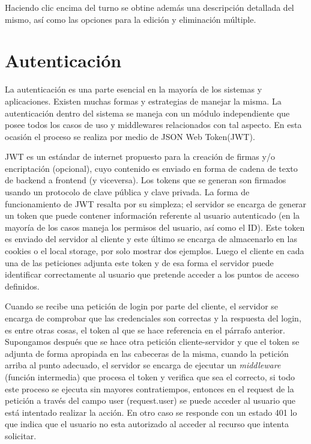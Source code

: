 Haciendo clic encima del turno se obtine además una descripción detallada del mismo, así como las opciones para la edición y eliminación múltiple.

\section{Autenticación}

La autenticación es una parte esencial en la mayoría de los sistemas y aplicaciones. Existen muchas formas y estrategias de manejar la misma. La autenticación dentro del sistema se maneja con un módulo independiente que posee todos los casos de uso y middlewares relacionados con tal aspecto. En esta ocasión el proceso se realiza por medio de JSON Web Token(JWT).

JWT es un estándar de internet propuesto para la creación de firmas y/o encriptación (opcional), cuyo contenido es enviado en forma de cadena de texto de backend a frontend (y viceversa). Los tokens que se generan son firmados usando un protocolo de clave pública y clave privada. La forma de funcionamiento de JWT resalta por su simpleza; el servidor se encarga de generar un token que puede contener información referente al usuario autenticado (en la mayoría de los casos maneja los permisos del usuario, así como el ID). Este token es enviado del servidor al cliente y este último se encarga de almacenarlo en las cookies o el local storage, por solo mostrar dos ejemplos. Luego el cliente en cada una de las peticiones adjunta este token y de esa forma el servidor puede identificar correctamente al usuario que pretende acceder a los puntos de acceso definidos.\cite{jwt_wiki}

Cuando se recibe una petición de login por parte del cliente, el servidor se encarga de comprobar que las credenciales son correctas y la respuesta del login, es entre otras cosas, el token al que se hace referencia en el párrafo anterior. Supongamos después que se hace otra petición cliente-servidor y que el token se adjunta de forma apropiada en las cabeceras de la misma, cuando la petición arriba al punto adecuado, el servidor se encarga de ejecutar un \textit{middleware} (función intermedia) que procesa el token y verifica que sea el correcto, si todo este proceso se ejecuta sin mayores contratiempos, entonces en el request de la petición a través del campo user (request.user) se puede acceder al usuario que está intentado realizar la acción. En otro caso se responde con un estado 401 lo que indica que el usuario no esta autorizado al acceder al recurso que intenta solicitar. 

